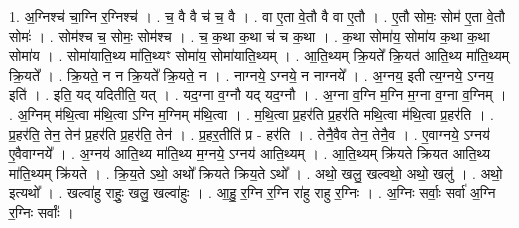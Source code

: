 \documentclass[17pt]{extarticle}
\begin{document}
1. अ॒ग्निश्च॑ चा॒ग्नि र॒ग्निश्च॑ । . च॒ वै वै च॑ च॒ वै । . वा ए॒ता वे॒तौ वै वा ए॒तौ । . ए॒तौ सोमः॒ सोम॑ ए॒ता वे॒तौ सोमः॑ । . सोम॑श्च च॒ सोमः॒ सोम॑श्च । . च॒ क॒था क॒था च॑ च क॒था । . क॒था सोमा॑य॒ सोमा॑य क॒था क॒था सोमा॑य । . सोमा॑याति॒थ्य मा॑ति॒थ्यꣳ सोमा॑य॒ सोमा॑याति॒थ्यम् । . आ॒ति॒थ्यम् क्रि॒यते᳚ क्रि॒यत॑ आति॒थ्य मा॑ति॒थ्यम् क्रि॒यते᳚ । . क्रि॒यते॒ न न क्रि॒यते᳚ क्रि॒यते॒ न । . नाग्नये॒ ऽग्नये॒ न नाग्नये᳚ । . अ॒ग्नय॒ इती त्य॒ग्नये॒ ऽग्नय॒ इति॑ । . इति॒ यद् यदितीति॒ यत् । . यद॒ग्ना व॒ग्नौ यद् यद॒ग्नौ । . अ॒ग्ना व॒ग्नि म॒ग्नि म॒ग्ना व॒ग्ना व॒ग्निम् । . अ॒ग्निम् म॑थि॒त्वा म॑थि॒त्वा ऽग्नि म॒ग्निम् म॑थि॒त्वा । . म॒थि॒त्वा प्र॒हर॑ति प्र॒हर॑ति मथि॒त्वा म॑थि॒त्वा प्र॒हर॑ति । . प्र॒हर॑ति॒ तेन॒ तेन॑ प्र॒हर॑ति प्र॒हर॑ति॒ तेन॑ । . प्र॒हर॒तीति॑ प्र - हर॑ति । . तेनै॒वैव तेन॒ तेनै॒व । . ए॒वाग्नये॒ ऽग्नय॑ ए॒वैवाग्नये᳚ । . अ॒ग्नय॑ आति॒थ्य मा॑ति॒थ्य म॒ग्नये॒ ऽग्नय॑ आति॒थ्यम् । . आ॒ति॒थ्यम् क्रि॑यते क्रियत आति॒थ्य मा॑ति॒थ्यम् क्रि॑यते । . क्रि॒य॒ते ऽथो॒ अथो᳚ क्रियते क्रिय॒ते ऽथो᳚ । . अथो॒ खलु॒ खल्वथो॒ अथो॒ खलु॑ । . अथो॒ इत्यथो᳚ । . खल्वा॑हु राहुः॒ खलु॒ खल्वा॑हुः । . आ॒हु॒ र॒ग्नि र॒ग्नि रा॑हु राहु र॒ग्निः । . अ॒ग्निः सर्वाः॒ सर्वा॑ अ॒ग्नि र॒ग्निः सर्वाः᳚ । \newline
\end{document}

